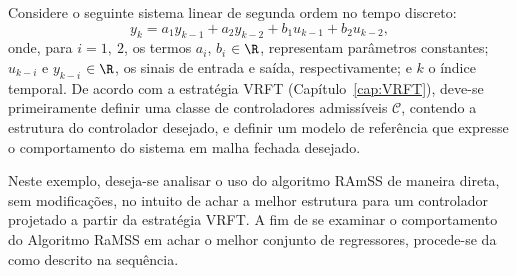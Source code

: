 %
\begin{exmp}\label{ex:sis2aord}
  Considere o seguinte sistema linear de segunda ordem no tempo discreto:
  \begin{equation}
    \label{eq:sis2aord}
    y_k = a_1y_{k-1} + a_2y_{k-2} + b_1u_{k-1} + b_2u_{k-2},
  \end{equation}
  onde, para $i = 1,\ 2$, os termos $a_i$, $b_i$ $\in \R$, representam parâmetros constantes; $u_{k-i}$ e $y_{k-i}$ $\in \R$, os sinais de entrada e saída, respectivamente; e $k$ o índice temporal.
  De acordo com a estratégia VRFT (Capítulo~\ref{cap:VRFT}), deve-se primeiramente definir uma classe de controladores admissíveis $\mathscr{C}$, contendo a estrutura do controlador desejado, e definir um modelo de referência que expresse o comportamento do sistema em malha fechada desejado.

  Neste exemplo, deseja-se analisar o uso do algoritmo RAmSS de maneira direta, sem modificações, no intuito de achar a melhor estrutura para um controlador projetado a partir da estratégia VRFT.
  A fim de se examinar o comportamento do Algoritmo RaMSS em achar o melhor conjunto de regressores, procede-se da como descrito na sequência.


\end{exmp}
